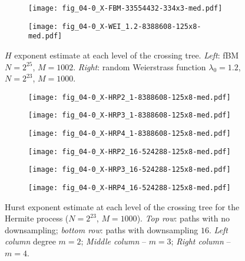 \documentclass[a4paper]{extarticle}
\begin{document}
\begin{figure}[ht]
  \centering
  \begin{subfigure}[b]{0.45\textwidth}
    \texttt{[image: fig\_04-0\_X-FBM-33554432-334x3-med.pdf]}
  \end{subfigure}\hspace{-2.em}
  \begin{subfigure}[b]{0.45\textwidth}
    \texttt{[image: fig\_04-0\_X-WEI\_1.2-8388608-125x8-med.pdf]}
  \end{subfigure}\vspace{-.5em}

  \caption{$H$ exponent estimate at each level of the crossing tree.
  \emph{Left}: fBM $N = 2^{25}$, $M=1002$.
  \emph{Right}: random Weierstrass function $\lambda_0=1.2$, $N = 2^{23}$, $M=1000$.}
  \label{fig:fbm_wei1_2_h_estimate}
\end{figure}

\begin{figure}[ht]
  \centering
  \begin{subfigure}[b]{0.3\textwidth}
    \texttt{[image: fig\_04-0\_X-HRP2\_1-8388608-125x8-med.pdf]}
  \end{subfigure}\hspace{-2.em}
  \begin{subfigure}[b]{0.3\textwidth}
    \texttt{[image: fig\_04-0\_X-HRP3\_1-8388608-125x8-med.pdf]}
  \end{subfigure}\hspace{-2.em}
  \begin{subfigure}[b]{0.3\textwidth}
    \texttt{[image: fig\_04-0\_X-HRP4\_1-8388608-125x8-med.pdf]}
  \end{subfigure}\vspace{-1.0em}

  \begin{subfigure}[b]{0.3\textwidth}
    \texttt{[image: fig\_04-0\_X-HRP2\_16-524288-125x8-med.pdf]}
  \end{subfigure}\hspace{-2.em}
  \begin{subfigure}[b]{0.3\textwidth}
    \texttt{[image: fig\_04-0\_X-HRP3\_16-524288-125x8-med.pdf]}
  \end{subfigure}\hspace{-2.em}
  \begin{subfigure}[b]{0.3\textwidth}
    \texttt{[image: fig\_04-0\_X-HRP4\_16-524288-125x8-med.pdf]}
  \end{subfigure}\vspace{-.5em}

  \caption{Hurst exponent estimate at each level of the crossing tree for the Hermite process
  ($N = 2^{23}$, $M=1000$). \emph{Top row}: paths with no downsampling; \emph{bottom row}: paths with
  downsampling $16$. \emph{Left column} degree $m=2$; \emph{Middle column} -- $m=3$;
  \emph{Right column} -- $m=4$.}
  \label{fig:hrp_hurst}
\end{figure}
\end{document}

